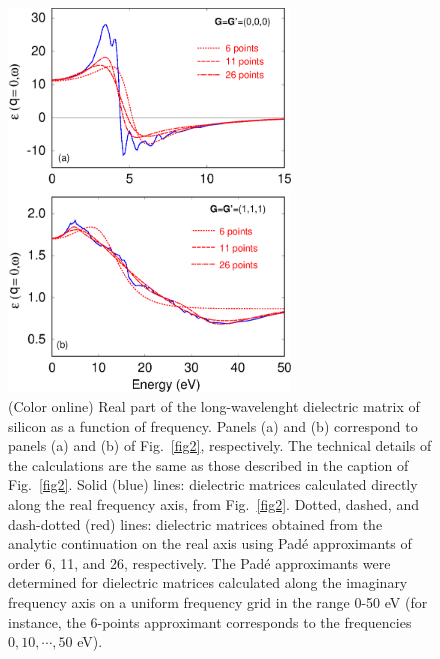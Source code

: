 \documentclass[twocolumn,prb,showpacs,superscriptaddress]{revtex4}
\begin{document}
\begin  {figure}
\begin  {center}
\includegraphics[width=7.5cm]{fig3.eps}
\end    {center}
\caption{\label{fig3}
        (Color online)
        Real part of the long-wavelenght dielectric matrix of silicon as a function of frequency. 
        Panels (a) and (b) correspond to panels (a) and (b) of Fig.\ \ref{fig2}, respectively. The 
        technical details of the calculations are the same as those described in the caption of Fig.\ \ref{fig2}.
        Solid (blue) lines: dielectric matrices calculated directly along the real frequency axis,
        from  Fig.\ \ref{fig2}. Dotted, dashed, and dash-dotted (red) lines: dielectric matrices
        obtained from the analytic continuation on the real axis using Pad\'e approximants of order
        6, 11, and 26, respectively. The Pad\'e approximants were determined for dielectric
        matrices calculated along the imaginary frequency axis on a uniform frequency grid 
        in the range 0-50 eV (for instance, the 6-points approximant corresponds to the frequencies $0,10,\cdots,50$ eV).
        }
\end    {figure}
\end{document}

